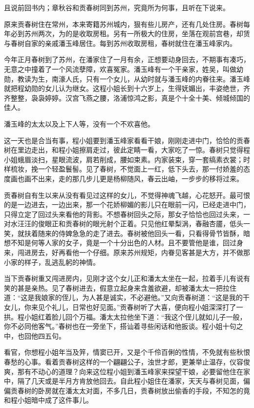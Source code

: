\documentclass[12pt,UTF8]{ctexbook}
\begin{document}
{{{且说前回书内；章秋谷和贡春树同到苏州，究竟所为何事，且听在下说来。

原来贡春树住在常州，本来寄籍苏州城内，狠有些儿房产，还有几处住房。春树每年必到苏州两次，为的是收取房租。另有一所极大的住房，坐落在观前宫巷，却赁与春树自家的亲戚潘玉峰居住。每到苏州收取房租，春树就住在潘玉峰家内。

今年正月春树到了苏州，在潘家住了一月有余，正想要动身回去，不期事有凑巧，无意之中撞着了一个风流孽障，欢喜冤家。潘玉峰有一个干亲家，姓吴，叫做幼勋，教读为生，南濠人氏，只有一个女儿，从幼时就与潘玉峰的内眷往来。潘玉峰就把程幼勋的女儿认为继女。这程小姐长到十六岁上，生得妩媚出，丰姿绝世，齐齐整整，袅袅婷婷。汉宫飞燕之腰，洛浦惊鸿之影，真是个十全十美、倾城倾国的佳人。

潘玉峰的太太以及上下人等，没有一个不欢喜他。

这一天也是合当有事，程小姐要到潘玉峰家看看干娘，刚刚走进中门，恰恰的贡春树在里边走出，和程小姐擦肩走过，彼此定睛一看，大家吃了一惊。春树只觉得程小姐蛾眉淡扫，星眼流波，肩若削成，腰如束素。内家装束，穿一套缟素衣裳；时样梳妆，挽一个轻盈鬟髻。见了春树，不觉面上一红，低下头去，那一付娇羞的态度画也画不出来，走的那几步儿更是杨柳随风，春云出岫，一步步的移将过来。

贡春树自有生以来从没有看见过这样的女儿，不觉得神魂飞越，心花怒开。最可恨的是一边进去，一边出来，那一个花娇柳媚的影儿只在眼前一闪，已经走进中门，只得立定了回过头来看他的背影。不想春树回头之际，那女子恰恰也回过头来，一对水汪汪的俊眼正和贡春树的眼光射个正着。只见他红晕梨涡，春融杏靥，低头一笑，就扶着随来的侍婢急急的走了进去。春树被他回头一看，只看得骨节皆酥，暗想不知是何等人家的女子，竟是一个十分出色的人材。且不要管他是谁，回过身来，闯进房去，好再看他一个仔细。原来苏州规矩，内眷见客甚是大方，并不做那小家的样子，乱逃乱躬的神情。

当下贡春树重又闯进房内，见刚才这个女儿正和潘太太坐在一起，拉着手儿有说有笑的甚是亲热。见了春树进去，假意立起身来含羞欲避，却被潘太太一把拉住道：“这是我娘家的侄儿，为人甚是诚实，不必避他。”又向贡春树道：“这是我的干女儿，你来见个礼儿，日常也好见面。”贡春树听了大喜，便向程小姐深深打了一拱。程小姐红着脸儿回个万福。潘太太拉他坐下道：“我这个侄儿就如儿子一般，你不必同他客气。”春树也在一旁坐下，搭讪着寻些闲话和他扳谈。程小姐十句之中，也回他四五句。

看官，你想程小姐年当及笄，情窦已开，又是个千伶百俐的性情，不免就有些秋恨春愁的心事。看着贡春树这样的一个翩翩公子，浊世才郎，更兼举止温存，仪容俊爽，那有不动心的道理？向来这位程小姐到潘玉峰家来探望干娘，必要留他住在家中，隔了几天或是半月方肯放他回去。自此程小姐住在潘家，天天与春树见面，偏偏贡春树的卧房就在潘太太对面，不多几日，贡春树放出偷香的手段，不知怎的竟和程小姐暗中成了这件事儿。

}}}
\end{document}
